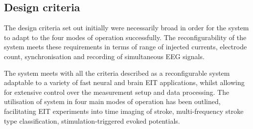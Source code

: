 \subsection{Design criteria}
The design criteria set out initially were necessarily broad in order for the system to adapt to the four modes of operation successfully. The reconfigurability of the system meets these requirements in terms of range of injected currents, electrode count, synchronisation and recording of simultaneous EEG signals. 



The system meets with all the criteria described as a reconfigurable system adaptable to a variety of fast neural and brain EIT applications, whilst allowing for extensive control over the measurement setup and data processing. The utilisation of system in four main modes of operation has been outlined, facilitating EIT experiments into time imaging of stroke, multi-frequency stroke type classification, stimulation-triggered evoked potentials. 